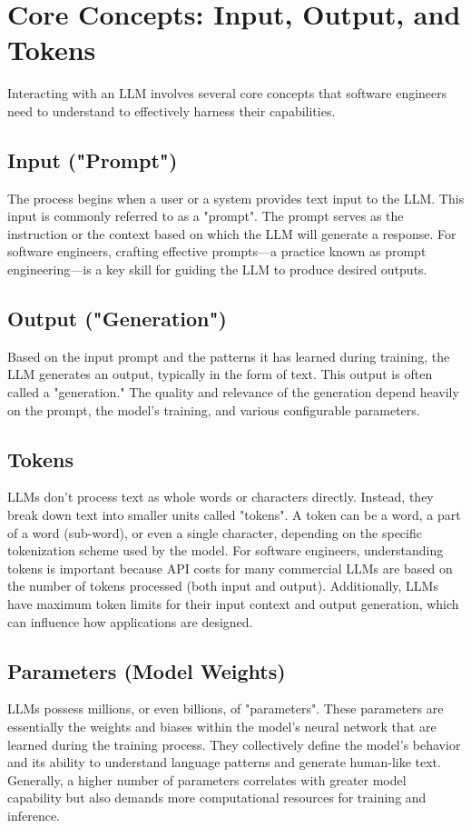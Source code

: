\section{Core Concepts: Input, Output, and Tokens}

Interacting with an LLM involves several core concepts that software engineers need to understand to effectively harness their capabilities.

\subsection*{Input ("Prompt")}
The process begins when a user or a system provides text input to the LLM. This input is commonly referred to as a "prompt". 
The prompt serves as the instruction or the context based on which the LLM will generate a response. For software engineers, 
crafting effective prompts---a practice known as prompt engineering---is a key skill for guiding the LLM to produce desired outputs.

\subsection*{Output ("Generation")}
Based on the input prompt and the patterns it has learned during training, the LLM generates an output, typically in the form of text. 
This output is often called a "generation." The quality and relevance of the generation depend heavily on the prompt, the model's training, 
and various configurable parameters.

\subsection*{Tokens}
LLMs don't process text as whole words or characters directly. Instead, they break down text into smaller units called "tokens". 
A token can be a word, a part of a word (sub-word), or even a single character, depending on the specific tokenization scheme used by the model. 
For software engineers, understanding tokens is important because API costs for many commercial LLMs are based on the number of tokens processed (both input and output). 
Additionally, LLMs have maximum token limits for their input context and output generation, which can influence how applications are designed.

\subsection*{Parameters (Model Weights)}
LLMs possess millions, or even billions, of "parameters". These parameters are essentially the weights and biases within the model's neural 
network that are learned during the training process. They collectively define the model's behavior and its ability to understand language patterns 
and generate human-like text. Generally, a higher number of parameters correlates with greater model capability but also demands more computational 
resources for training and inference.


